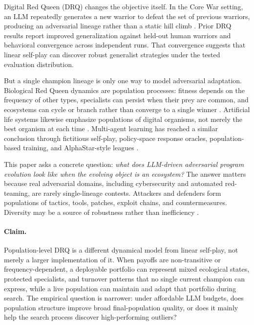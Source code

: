 \documentclass[11pt]{article}
\begin{document}
Digital Red Queen (DRQ) changes the objective itself. In the Core War setting, an LLM repeatedly generates a new warrior to defeat the set of previous warriors, producing an adversarial lineage rather than a static hill climb \citep{kumar2026digital}. Prior DRQ results report improved generalization against held-out human warriors and behavioral convergence across independent runs. That convergence suggests that linear self-play can discover robust generalist strategies under the tested evaluation distribution.

But a single champion lineage is only one way to model adversarial adaptation. Biological Red Queen dynamics are population processes: fitness depends on the frequency of other types, specialists can persist when their prey are common, and ecosystems can cycle or branch rather than converge to a single winner \citep{vanvalen1973redqueen,dawkins1979armsraces,maynard1973logic,sinervo1996rps,hofbauer1998evolutionary}. Artificial life systems likewise emphasize populations of digital organisms, not merely the best organism at each time \citep{ray1991tierra,adami1994avida,ofria2004avida}. Multi-agent learning has reached a similar conclusion through fictitious self-play, policy-space response oracles, population-based training, and AlphaStar-style leagues \citep{heinrich2016nfsp,lanctot2017psro,jaderberg2017pbt,vinyals2019alphastar}.

This paper asks a concrete question: \emph{what does LLM-driven adversarial program evolution look like when the evolving object is an ecosystem?} The answer matters because real adversarial domains, including cybersecurity and automated red-teaming, are rarely single-lineage contests. Attackers and defenders form populations of tactics, tools, patches, exploit chains, and countermeasures. Diversity may be a source of robustness rather than inefficiency \citep{perez2022redteaming,ganguli2022redteaming,samvelyan2024rainbow}.

\paragraph{Claim.}
Population-level DRQ is a different dynamical model from linear self-play, not merely a larger implementation of it. When payoffs are non-transitive or frequency-dependent, a deployable portfolio can represent mixed ecological states, protected specialists, and turnover patterns that no single current champion can express, while a live population can maintain and adapt that portfolio during search. The empirical question is narrower: under affordable LLM budgets, does population structure improve broad final-population quality, or does it mainly help the search process discover high-performing outliers?
\end{document}
